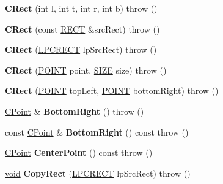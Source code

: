 \begin{DoxyCompactItemize}
\item 
\mbox{\label{class_c_rect_a245286f5f88483a50a7be36845fceb05}} 
{\bfseries C\+Rect} (int l, int t, int r, int b)  throw ()
\item 
\mbox{\label{class_c_rect_ae8c3d10254e6b0618a5d51ffdc5282d1}} 
{\bfseries C\+Rect} (const \hyperlink{structtag_r_e_c_t}{R\+E\+CT} \&src\+Rect)  throw ()
\item 
\mbox{\label{class_c_rect_a49abd57097c2447a529e8fab5e59ec9e}} 
{\bfseries C\+Rect} (\hyperlink{structtag_r_e_c_t}{L\+P\+C\+R\+E\+CT} lp\+Src\+Rect)  throw ()
\item 
\mbox{\label{class_c_rect_ac1d653b87c1384ad9737f73f539dc60b}} 
{\bfseries C\+Rect} (\hyperlink{structtag_p_o_i_n_t}{P\+O\+I\+NT} point, \hyperlink{structtag_s_i_z_e}{S\+I\+ZE} size)  throw ()
\item 
\mbox{\label{class_c_rect_a1ec9f3b0dade9ed0f0f374a1812e85b9}} 
{\bfseries C\+Rect} (\hyperlink{structtag_p_o_i_n_t}{P\+O\+I\+NT} top\+Left, \hyperlink{structtag_p_o_i_n_t}{P\+O\+I\+NT} bottom\+Right)  throw ()
\item 
\mbox{\label{class_c_rect_ad2639dd6afb746cb161a9cdb634a6a61}} 
\hyperlink{class_c_point}{C\+Point} \& {\bfseries Bottom\+Right} ()  throw ()
\item 
\mbox{\label{class_c_rect_a8d719f6caa5e9bf56d3a9a9a362d2080}} 
const \hyperlink{class_c_point}{C\+Point} \& {\bfseries Bottom\+Right} () const  throw ()
\item 
\mbox{\label{class_c_rect_a20692e0c63b4aa346626e245596d86cc}} 
\hyperlink{class_c_point}{C\+Point} {\bfseries Center\+Point} () const  throw ()
\item 
\mbox{\label{class_c_rect_a98faffc545d7cfa4b65aecb88fac5a9e}} 
\hyperlink{interfacevoid}{void} {\bfseries Copy\+Rect} (\hyperlink{structtag_r_e_c_t}{L\+P\+C\+R\+E\+CT} lp\+Src\+Rect)  throw ()
\item 
\mbox{\label{class_c_rect_afc17facb4d85760ce6027de33665ac16}} 

\end{DoxyCompactItemize}
